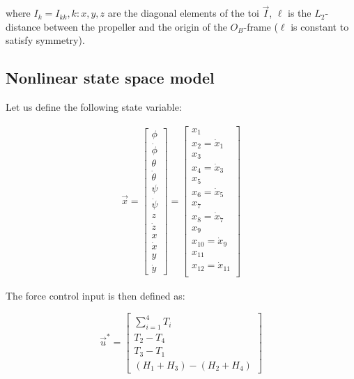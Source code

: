 where $I_k = I_{kk}, k:x,y,z$ are the diagonal elements of the \gls{toi} $\vec{I}$, $\ell$ is the $L_2$-distance between the propeller and the origin of the $O_B$-frame ($\ell$ is constant to satisfy symmetry).

\subsection{Nonlinear state space model}

Let us define the following state variable:

\begin{equation}
	\begin{split}
		\vec{x} = 
		\begin{bmatrix}
			\phi \\
			\dot\phi \\
			\theta \\
			\dot\theta \\
			\psi \\
			\dot\psi \\
			z \\
			\dot z \\
			x \\
			\dot x \\
			y \\
			\dot y
		\end{bmatrix}
		=
		\begin{bmatrix}
			x_1 \\
			x_2 = \dot{x}_1 \\
			x_3 \\
			x_4 = \dot{x}_3 \\
			x_5 \\
			x_6 = \dot{x}_5 \\
			x_7 \\
			x_8 = \dot{x}_7 \\
			x_9 \\
			x_{10} = \dot{x}_9 \\
			x_{11} \\
			x_{12} = \dot{x}_{11} \\
		\end{bmatrix}
	\end{split}
\end{equation}

The force control input is then defined as:

\begin{equation}
	\vec{u}^* =
	\begin{bmatrix}
		\sum_{i=1}^{4} T_i \\
		T_2 - T_4 \\
		T_3 - T_1 \\
		(H_1 + H_3) - (H_2 + H_4)
	\end{bmatrix}
\end{equation}


